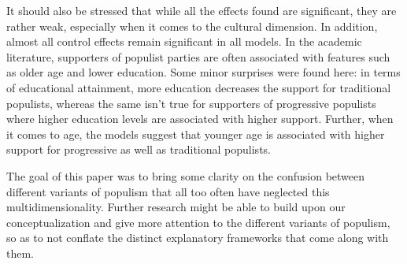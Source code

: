 \documentclass[]{article}
\begin{document}
It should also be stressed that while all the effects found are
significant, they are rather weak, especially when it comes to the
cultural dimension. In addition, almost all control effects remain
significant in all models. In the academic literature, supporters of
populist parties are often associated with features such as older age
and lower education. Some minor surprises were found here: in terms of
educational attainment, more education decreases the support for
traditional populists, whereas the same isn't true for supporters of
progressive populists where higher education levels are associated with
higher support. Further, when it comes to age, the models suggest that
younger age is associated with higher support for progressive as well as
traditional populists.

The goal of this paper was to bring some clarity on the confusion
between different variants of populism that all too often have neglected
this multidimensionality. Further research might be able to build upon
our conceptualization and give more attention to the different variants
of populism, so as to not conflate the distinct explanatory frameworks
that come along with them.
\end{document}
